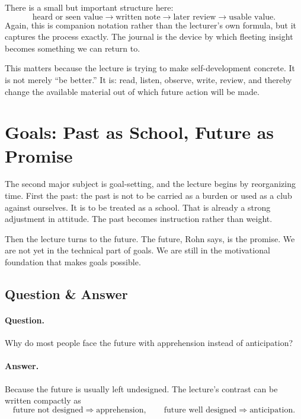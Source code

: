 There is a small but important structure here:
\begin{equation}
\text{heard or seen value} \longrightarrow \text{written note} \longrightarrow \text{later review} \longrightarrow \text{usable value}.
\end{equation}
Again, this is companion notation rather than the lecturer's own formula, but it captures the process exactly. The journal is the device by which fleeting insight becomes something we can return to.

This matters because the lecture is trying to make self-development concrete. It is not merely ``be better.'' It is: read, listen, observe, write, review, and thereby change the available material out of which future action will be made.

\section{Goals: Past as School, Future as Promise}

The second major subject is goal-setting, and the lecture begins by reorganizing time. First the past: the past is not to be carried as a burden or used as a club against ourselves. It is to be treated as a school. That is already a strong adjustment in attitude. The past becomes instruction rather than weight.

Then the lecture turns to the future. The future, Rohn says, is the promise. We are not yet in the technical part of goals. We are still in the motivational foundation that makes goals possible.

\subsection{Question \& Answer}

\paragraph{Question.} Why do most people face the future with apprehension instead of anticipation?

\paragraph{Answer.} Because the future is usually left undesigned. The lecture's contrast can be written compactly as
\begin{equation}
\text{future not designed} \Rightarrow \text{apprehension}, \qquad
\text{future well designed} \Rightarrow \text{anticipation}.
\end{equation}


